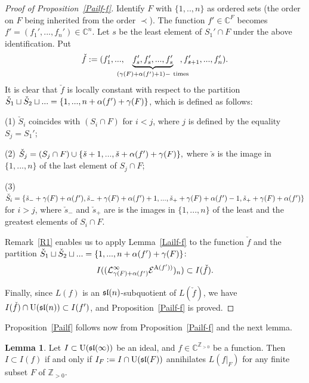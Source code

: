 \documentclass[10pt]{amsart}\oddsidemargin -1mm \evensidemargin -1mm \topmargin -15mm\headheight5mm \headsep 3.5mm \textheight 245mm\textwidth 170mm %
\theoremstyle{definition}\newtheorem{theorem}{Theorem}[section]\newtheorem{lemma}[theorem]{Lemma}\newtheorem{remark}[theorem]{Remark}\newtheorem{proposition}[theorem]{Proposition}\newtheorem{corollary}[theorem]{Corollary}\newtheorem{definition}[theorem]{Definition}\newtheorem{Ex}[theorem]{Example}
\begin{document}
\begin{proof}[Proof of Proposition~\ref{Pailf-f}] Identify $F$ with $\{1,.., n\}$ as ordered sets (the order on $F$ being inherited from the order $\prec$). The function $f'\in\mathbb C^F$ becomes $f'=(f_1',..., f_n')\in\mathbb C^n$. Let $s$ be the least element of $S_1'\cap F$ under the above identification. Put $$\check f:=(f_1',...,\hspace{-10pt}\underbrace{f_s', f_s',..., f_s'}_{(\gamma(F)+\nint(f')+1)-~\mathrm{times}},\hspace{-15pt}, f_{s+1}',..., f_n').$$It is clear that $\check f$ is locally constant with respect to the partition $\check S_1\sqcup\check S_2\sqcup...=\{1,..., n+\operatorname{\alpha}(f')+\gamma(F)\}$, which is defined as follows:

(1) $\check S_i$ coincides with $(S_i\cap F)$ for $i<j$, where $j$ is defined by the equality $S_j=S_1'$;

(2) $\check S_j=(S_j\cap F)\cup\{\check s+1,..., \check s+\operatorname{\alpha}(f')+\gamma(F)\},$ where $\check s$ is the image in $\{1,..., n\}$ of the last element of $S_j\cap F$;

(3) $\check S_i=\{\check s_-+\gamma(F)+\operatorname{\alpha}(f'), \check s_-+\gamma(F)+\operatorname{\alpha}(f')+1,..., \check s_++\gamma(F)+\operatorname{\alpha}(f')-1, \check s_++\gamma(F)+\operatorname{\alpha}(f')\}$ for $i>j$, where $\check s_-$ and $\check s_+$ are is the images in $\{1,..., n\}$ of the least and the greatest elements of $S_i\cap F$.

Remark~\ref{R1} enables us to apply Lemma~\ref{Lailf-f} to the function $\check f$ and the partition $\check S_1\sqcup\check S_2\sqcup...=\{1,..., n+\operatorname{\alpha}(f')+\gamma(F)\}$:
$$I((\mathcal L_{\gamma(F)+\operatorname{\alpha}(f')}^\infty\mathcal E^{\operatorname{A}(f'))})_{n})\subset I(\check f).$$

Finally, since $L(f)$ is an $\frak{sl}(n)$-subquotient of $L(\check f)$, we have $I(\check f)\cap\operatorname{\mathrm{U}}(\frak{sl}(n))\subset I(f')$, and Proposition~\ref{Pailf-f} is proved.\end{proof}
Proposition~\ref{Pailf} follows now from Proposition~\ref{Pailf-f} and the next lemma.
\begin{lemma}\label{Lidmo}Let $I\subset\operatorname{\mathrm{U}}(\frak{sl}(\infty))$ be an ideal, and $f\in\mathbb C^{\mathbb Z_{>0}}$ be a function. Then $I\subset I(f)$ if and only if $I_F:=I\cap\operatorname{\mathrm{U}}(\frak{sl}(F))$ annihilates $L(f|_F)$ for any finite subset $F$ of $\mathbb Z_{>0}$.\end{lemma}
\end{document}
